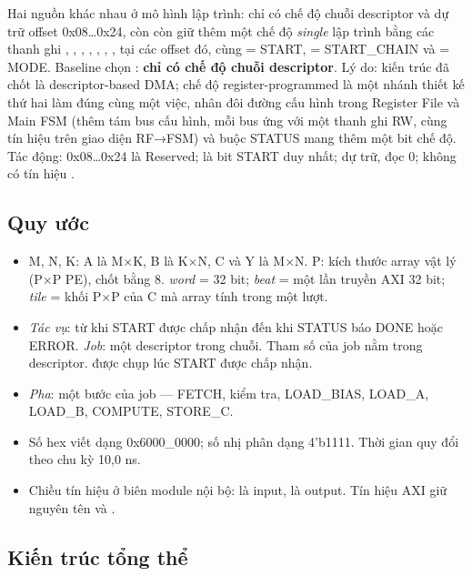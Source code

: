 \begin{notebox}
Hai nguồn khác nhau ở mô hình lập trình:  chỉ có chế độ chuỗi descriptor và dự trữ
offset 0x08…0x24, còn  còn giữ thêm một chế độ \emph{single} lập trình bằng các thanh ghi
, , , ,
, , ,  tại các offset đó, cùng
 = START,  = START\_CHAIN và  = MODE.
Baseline chọn : \textbf{chỉ có chế độ chuỗi descriptor}. Lý do: kiến trúc đã chốt là
descriptor-based DMA; chế độ register-programmed là một nhánh thiết kế thứ hai làm đúng cùng một
việc, nhân đôi đường cấu hình trong Register File và Main FSM (thêm tám bus cấu hình, mỗi bus ứng với một
thanh ghi RW, cùng tín hiệu  trên giao diện RF→FSM) và buộc STATUS mang thêm một bit chế độ. Tác động: 0x08…0x24 là Reserved;  là
bit START duy nhất;  dự trữ, đọc 0; không có tín hiệu .
\end{notebox}

\subsection{Quy ước}\label{sec:1.2}
\begin{itemize}
\item M, N, K: A là M×K, B là K×N, C và Y là M×N. P: kích thước array vật lý (P×P PE), chốt bằng 8. \emph{word} = 32 bit; \emph{beat} = một lần truyền AXI 32 bit; \emph{tile} = khối P×P của C mà array tính trong một lượt.
\item \emph{Tác vụ}: từ khi START được chấp nhận đến khi STATUS báo DONE hoặc ERROR. \emph{Job}: một descriptor trong chuỗi. Tham số của job nằm trong descriptor.  được chụp lúc START được chấp nhận.
\item \emph{Pha}: một bước của job — FETCH, kiểm tra, LOAD\_BIAS, LOAD\_A, LOAD\_B, COMPUTE, STORE\_C.
\item Số hex viết dạng 0x6000\_0000; số nhị phân dạng 4'b1111. Thời gian quy đổi theo chu kỳ  10,0 ns.
\item Chiều tín hiệu ở biên module nội bộ:  là input,  là output. Tín hiệu AXI giữ nguyên tên  và .
\end{itemize}

\subsection{Kiến trúc tổng thể}\label{sec:1.3}


